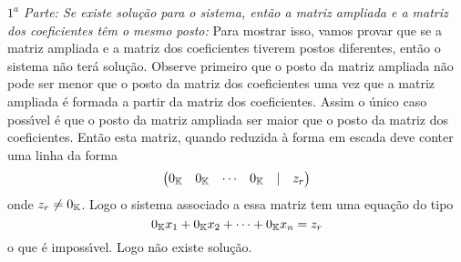 \begin{prova}
\textit{$1^a$ Parte: Se existe solu\c{c}\~ao para o sistema, ent\~ao a matriz ampliada e a matriz dos coeficientes t\^em o mesmo posto:} Para mostrar isso, vamos provar que se a matriz ampliada e a matriz dos coeficientes tiverem postos diferentes, ent\~ao o sistema n\~ao ter\'a solu\c{c}\~ao. Observe primeiro que o posto da matriz ampliada n\~ao pode ser menor que o posto da matriz dos coeficientes uma vez que a matriz ampliada \'e formada a partir da matriz dos coeficientes. Assim o \'unico caso poss{\'\i}vel \'e que o posto da matriz ampliada ser maior que o posto da matriz dos coeficientes. Ent\~ao esta matriz, quando reduzida \`a forma em escada deve conter uma linha da forma
\[
\begin{pmatrix}
0_{\mathbb{K}} & 0_{\mathbb{K}} & \cdots & 0_{\mathbb{K}} & \mid & z_r
\end{pmatrix}
\]
onde $z_r \ne 0_{\mathbb{K}}$.
Logo o sistema associado a essa matriz tem uma equa\c{c}\~ao do tipo
\[
0_{\mathbb{K}}x_1 + 0_{\mathbb{K}}x_2 + \cdots + 0_{\mathbb{K}}x_n = z_r
\]
o que \'e imposs{\'\i}vel. Logo n\~ao existe solu\c{c}\~ao.


\end{prova}
